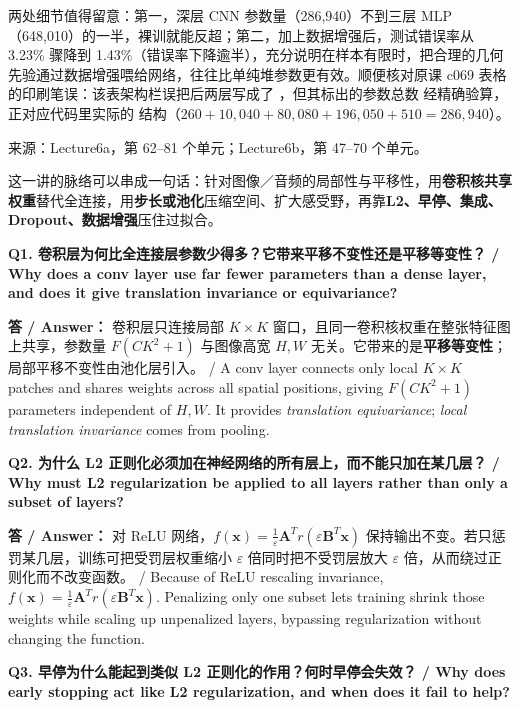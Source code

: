 两处细节值得留意：第一，深层 CNN 参数量（286,940）不到三层 MLP（648,010）的一半，裸训就能反超；第二，加上数据增强后，测试错误率从 3.23\% 骤降到 1.43\%（错误率下降逾半），充分说明在样本有限时，把合理的几何先验通过数据增强喂给网络，往往比单纯堆参数更有效。顺便核对原课 c069 表格的印刷笔误：该表架构栏误把后两层写成了 ，但其标出的参数总数  经精确验算，正对应代码里实际的  结构（$260+10{,}040+80{,}080+196{,}050+510=286{,}940$）。

来源：Lecture6a，第 62–81 个单元；Lecture6b，第 47–70 个单元。



这一讲的脉络可以串成一句话：针对图像／音频的局部性与平移性，用\textbf{卷积核共享权重}替代全连接，用\textbf{步长或池化}压缩空间、扩大感受野，再靠\textbf{L2、早停、集成、Dropout、数据增强}压住过拟合。

\textbf{Q1. 卷积层为何比全连接层参数少得多？它带来平移不变性还是平移等变性？ / Why does a conv layer use far fewer parameters than a dense layer, and does it give translation invariance or equivariance?}

\textbf{答 / Answer：} 卷积层只连接局部 $K\times K$ 窗口，且同一卷积核权重在整张特征图上共享，参数量 $F(CK^2+1)$ 与图像高宽 $H,W$ 无关。它带来的是\textbf{平移等变性}；局部平移不变性由池化层引入。 / A conv layer connects only local $K\times K$ patches and shares weights across all spatial positions, giving $F(CK^2+1)$ parameters independent of $H,W$. It provides \emph{translation equivariance}; \emph{local translation invariance} comes from pooling.

\textbf{Q2. 为什么 L2 正则化必须加在神经网络的所有层上，而不能只加在某几层？ / Why must L2 regularization be applied to all layers rather than only a subset of layers?}

\textbf{答 / Answer：} 对 ReLU 网络，$f(\mathbf{x})=\frac{1}{\varepsilon}\mathbf{A}^T r(\varepsilon\mathbf{B}^T\mathbf{x})$ 保持输出不变。若只惩罚某几层，训练可把受罚层权重缩小 $\varepsilon$ 倍同时把不受罚层放大 $\varepsilon$ 倍，从而绕过正则化而不改变函数。 / Because of ReLU rescaling invariance, $f(\mathbf{x})=\frac{1}{\varepsilon}\mathbf{A}^T r(\varepsilon\mathbf{B}^T\mathbf{x})$. Penalizing only one subset lets training shrink those weights while scaling up unpenalized layers, bypassing regularization without changing the function.

\textbf{Q3. 早停为什么能起到类似 L2 正则化的作用？何时早停会失效？ / Why does early stopping act like L2 regularization, and when does it fail to help?}


